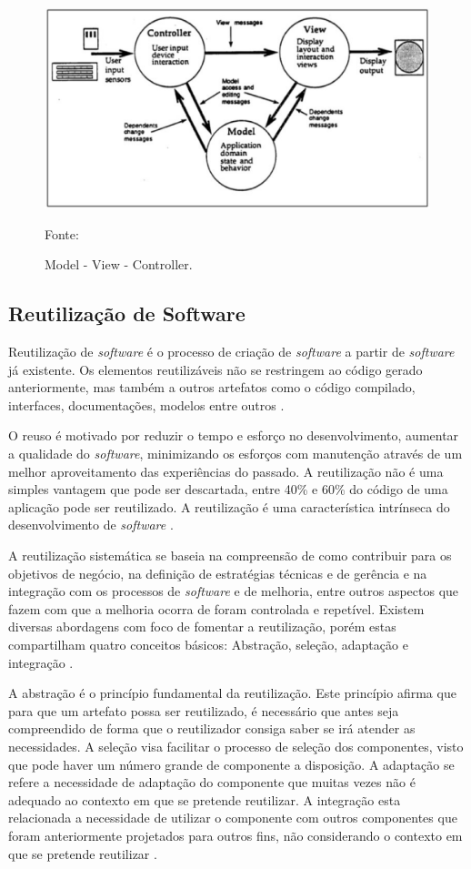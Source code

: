 \begin{figure}[h!]
	\centering
  	\includegraphics[width=.9\linewidth]{figuras/mvc.eps}
  	\caption{Model - View - Controller.}
	\small{Fonte: \cite{krasner1988}}
  	\label{fig:mvc}
\end{figure} 

\subsection{Reutilização de Software}

Reutilização de \textit{software} é o processo de criação de \textit{software} a partir de \textit{software} já existente. Os elementos reutilizáveis não se restringem ao código gerado anteriormente, mas também a outros artefatos como o código compilado, interfaces, documentações, modelos entre outros \cite{krueger1992, dsouza1999}.

O reuso é motivado por reduzir o tempo e esforço no desenvolvimento, aumentar a qualidade do \textit{software}, minimizando os esforços com manutenção através de um melhor aproveitamento das experiências do passado. A reutilização não é uma simples vantagem que pode ser descartada, entre 40\% e 60\% do código de uma aplicação pode ser reutilizado. A reutilização é uma característica intrínseca do desenvolvimento de \textit{software} \cite{lucredio2009}.

A reutilização sistemática se baseia na compreensão de como contribuir para os objetivos de negócio, na definição de estratégias técnicas e de gerência e na integração com os processos de \textit{software} e de melhoria, entre outros aspectos que fazem com que a melhoria ocorra de foram controlada e repetível. Existem diversas abordagens com foco de fomentar a reutilização, porém estas compartilham quatro conceitos básicos: Abstração, seleção, adaptação e integração \cite{krueger1992, ezran2002, lucredio2009}.

A abstração é o princípio fundamental da reutilização. Este princípio afirma que para que um artefato possa ser reutilizado, é necessário que antes seja compreendido de forma que o reutilizador consiga saber se irá atender as necessidades. A seleção visa facilitar o processo de seleção dos componentes, visto que pode haver um número grande de componente a disposição. A adaptação se refere a necessidade de adaptação do componente que muitas vezes não é adequado ao contexto em que se pretende reutilizar. A integração esta relacionada a necessidade de utilizar o componente com outros componentes que foram anteriormente projetados para outros fins, não considerando o contexto em que se pretende reutilizar \cite{krueger1992}.